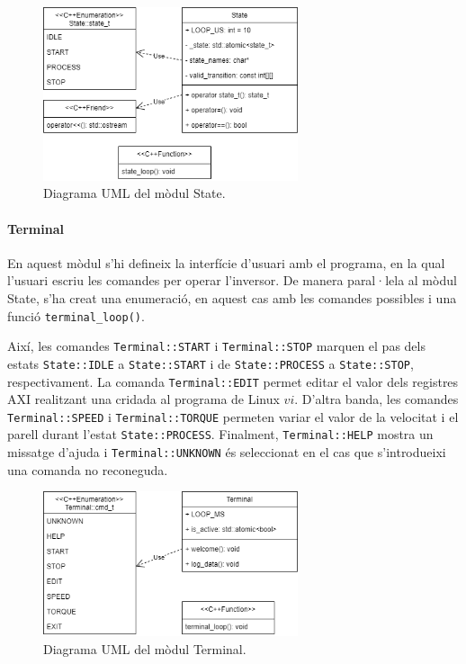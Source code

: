 {{{            \begin{figure}[!htb]
                \centering
                \captionsetup{justification=centering,margin=1.5cm}
                \includegraphics[width=7.5cm]
                    { img/4_implementacio/uml_state.png }
                \caption{ Diagrama UML del mòdul State.  }
            \end{figure}
        }

        \paragraph{Terminal} 
        { 
            En aquest mòdul s'hi defineix la interfície d'usuari amb el
            programa, en la qual l'usuari escriu les comandes per operar
            l'inversor. De manera paral·lela al mòdul State, s'ha creat una
            enumeració, en aquest cas amb les comandes possibles i una funció
            \lstinline{terminal_loop()}. 
            
            Així, les comandes \lstinline{Terminal::START} i
            \lstinline{Terminal::STOP} marquen el pas dels estats
            \lstinline{State::IDLE} a \lstinline{State::START} i de
            \lstinline{State::PROCESS} a \lstinline{State::STOP},
            respectivament. La comanda \lstinline{Terminal::EDIT} permet editar
            el valor dels registres AXI realitzant una cridada al programa de
            Linux $vi$. D'altra banda, les comandes \lstinline{Terminal::SPEED}
            i \lstinline{Terminal::TORQUE} permeten variar el valor de la
            velocitat i el parell durant l'estat \lstinline{State::PROCESS}.
            Finalment, \lstinline{Terminal::HELP} mostra un missatge d'ajuda i
            \lstinline{Terminal::UNKNOWN} és seleccionat en el cas que
            s'introdueixi una comanda no reconeguda.

            \begin{figure}[!htb]
                \centering
                \captionsetup{justification=centering,margin=1.5cm}
                \includegraphics[width=7.5cm]
                    { img/4_implementacio/uml_terminal.png }
                \caption{ Diagrama UML del mòdul Terminal.  }
            \end{figure}
        }

}}
